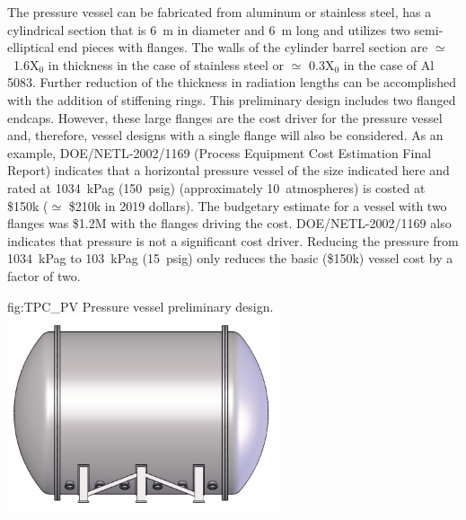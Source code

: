 The pressure vessel can be fabricated from aluminum or stainless steel, has a cylindrical section that is 6~m in diameter and 6~m long and utilizes two semi-elliptical end pieces with flanges. The walls of the cylinder barrel section are $\simeq$~1.6X$_0$ in thickness in the case of stainless steel or $\simeq$ 0.3X$_0$ in the case of Al 5083.  Further reduction of the thickness in radiation lengths can be accomplished  with the addition of stiffening rings.   This preliminary design includes two flanged endcaps.  However, these large flanges are the cost driver for the pressure vessel and, therefore, vessel designs with a single flange will also be considered.  As an example, DOE/NETL-2002/1169 (Process Equipment Cost Estimation
Final Report) indicates that a horizontal pressure vessel of the size indicated here and rated at \SI{1034}{kPag} (\SI{150}{psig}) (approximately 10~atmospheres) is costed at \$150k ($\simeq$ \$210k in 2019 dollars).  The budgetary estimate for a vessel with two flanges was \$1.2M with the flanges driving the cost.  DOE/NETL-2002/1169 also indicates that pressure is not a significant cost driver.  Reducing the pressure from \SI{1034}{kPag} to \SI{103}{kPag} (\SI{15}{psig}) only reduces the basic (\$150k) vessel cost by a factor of two.

\begin{dunefigure}{fig:TPC_PV}
{Pressure vessel preliminary design.}
\includegraphics[width=0.6\textwidth]{graphics/tpc_pressurevessel.png}
\end{dunefigure}


